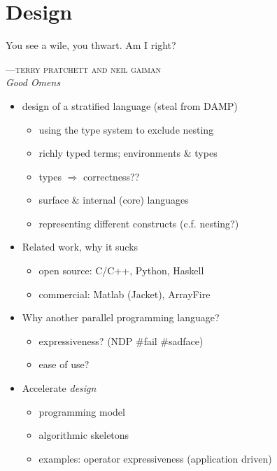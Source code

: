 %
%
%
%

\chapter{Design}
\epigraph{You see a wile, you thwart. Am I right?}%
{\textsc{---terry pratchett and neil gaiman}\\\textit{Good Omens}}

\begin{itemize}
    \item design of a stratified language (steal from DAMP)
        \begin{itemize}
            \item using the type system to exclude nesting
            \item richly typed terms; environments \& types
            \item types $\Rightarrow$ correctness??
            \item surface \& internal (core) languages
            \item representing different constructs (c.f. nesting?)
        \end{itemize}

    \item Related work, why it sucks
        \begin{itemize}
            \item open source: C/C++, Python, Haskell
            \item commercial: Matlab (Jacket), ArrayFire
        \end{itemize}

    \item Why another parallel programming language?
        \begin{itemize}
            \item expressiveness? (NDP \#fail \#sadface)
            \item ease of use?
        \end{itemize}

    \item Accelerate \textit{design}
        \begin{itemize}
            \item programming model
            \item algorithmic skeletons
            \item examples: operator expressiveness (application driven)
        \end{itemize}

\end{itemize}


